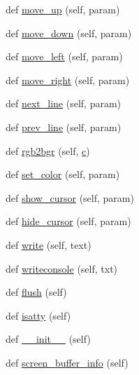 \begin{DoxyCompactItemize}
\item 
def \hyperlink{classwaflib_1_1ansiterm_1_1_ansi_term_a7725bd9ed185458669ad7601fb7ff9d9}{move\+\_\+up} (self, param)
\item 
def \hyperlink{classwaflib_1_1ansiterm_1_1_ansi_term_a7b2ea0403457b7cd8d0ac4088064d812}{move\+\_\+down} (self, param)
\item 
def \hyperlink{classwaflib_1_1ansiterm_1_1_ansi_term_a617dda0ced0a3e3f3443366d4a1c46bb}{move\+\_\+left} (self, param)
\item 
def \hyperlink{classwaflib_1_1ansiterm_1_1_ansi_term_a1388984c5cb5051d6c48682d1cd998b7}{move\+\_\+right} (self, param)
\item 
def \hyperlink{classwaflib_1_1ansiterm_1_1_ansi_term_a8ce79cf478dc1bf0cec2c12e28103522}{next\+\_\+line} (self, param)
\item 
def \hyperlink{classwaflib_1_1ansiterm_1_1_ansi_term_ac65f3453904e9c561f530b7c43e73f12}{prev\+\_\+line} (self, param)
\item 
def \hyperlink{classwaflib_1_1ansiterm_1_1_ansi_term_ad097d16ecb1babcef5970faccad1e7e9}{rgb2bgr} (self, \hyperlink{rfft2d_test_m_l_8m_ae0323a9039add2978bf5b49550572c7c}{c})
\item 
def \hyperlink{classwaflib_1_1ansiterm_1_1_ansi_term_a2b56ee3c8294f7e2e5bca7cc60e8ee05}{set\+\_\+color} (self, param)
\item 
def \hyperlink{classwaflib_1_1ansiterm_1_1_ansi_term_a594f6cf62d5e4ca33f2b88127fd6393d}{show\+\_\+cursor} (self, param)
\item 
def \hyperlink{classwaflib_1_1ansiterm_1_1_ansi_term_a2ca4bde33edd4afa92c8bda3f01d1dc9}{hide\+\_\+cursor} (self, param)
\item 
def \hyperlink{classwaflib_1_1ansiterm_1_1_ansi_term_a03ecdf1c9e54a69800aae320175c281b}{write} (self, text)
\item 
def \hyperlink{classwaflib_1_1ansiterm_1_1_ansi_term_a8296f875a3fd0a03fc109073f2a73a3e}{writeconsole} (self, txt)
\item 
def \hyperlink{classwaflib_1_1ansiterm_1_1_ansi_term_a08667242c11cdfd8b74d64f8191d4938}{flush} (self)
\item 
def \hyperlink{classwaflib_1_1ansiterm_1_1_ansi_term_a08e698612e76adc1aa3e26cdc5cb2009}{isatty} (self)
\item 
def \hyperlink{classwaflib_1_1ansiterm_1_1_ansi_term_ab397a7401f836bb9f96d9e54c6333821}{\+\_\+\+\_\+init\+\_\+\+\_\+} (self)
\item 
def \hyperlink{classwaflib_1_1ansiterm_1_1_ansi_term_afdb1bac8f2508bdf2279320b85286196}{screen\+\_\+buffer\+\_\+info} (self)

\end{DoxyCompactItemize}
